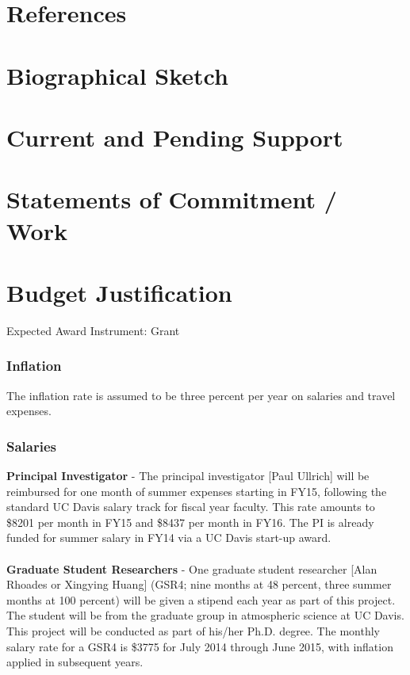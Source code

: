 \documentclass[11pt]{article}
\begin{document}
\section{References}
  

 
\section{Biographical Sketch}

\section{Current and Pending Support}

\section{Statements of Commitment / Work}

\section{Budget Justification}
Expected Award Instrument:  Grant

\subsubsection{Inflation}
The inflation rate is assumed to be three percent per year on salaries and travel expenses.

\subsubsection{Salaries}
\textbf{Principal Investigator} -
The principal investigator [Paul Ullrich] will be reimbursed for one month of summer expenses starting in FY15, following the standard UC Davis salary track for fiscal year faculty. This rate amounts to \$8201 per month in FY15 and \$8437 per month in FY16. The PI is already funded for summer salary in FY14 via a UC Davis start-up award.
\\\\
\textbf{Graduate Student Researchers} -
One graduate student researcher [Alan Rhoades or Xingying Huang] (GSR4; nine months at 48 percent, three summer months at 100 percent) will be given a stipend each year as part of this project. The student will be from the graduate group in atmospheric science at UC Davis. This project will be conducted as part of his/her Ph.D. degree. The monthly salary rate for a GSR4 is \$3775 for July 2014 through June 2015, with inflation applied in subsequent years.
\end{document}
